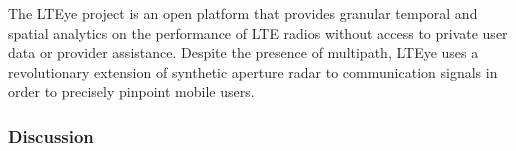 \documentclass[conference]{IEEEtran}
\begin{document}
The LTEye project \cite{KumarLTE} is an open platform that provides granular
temporal and spatial analytics on the performance of LTE radios without access
to private user data or provider assistance. Despite the presence of multipath,
LTEye uses a revolutionary extension of synthetic aperture radar to communication
signals in order to precisely pinpoint mobile users.

\subsubsection{Discussion}
\end{document}
